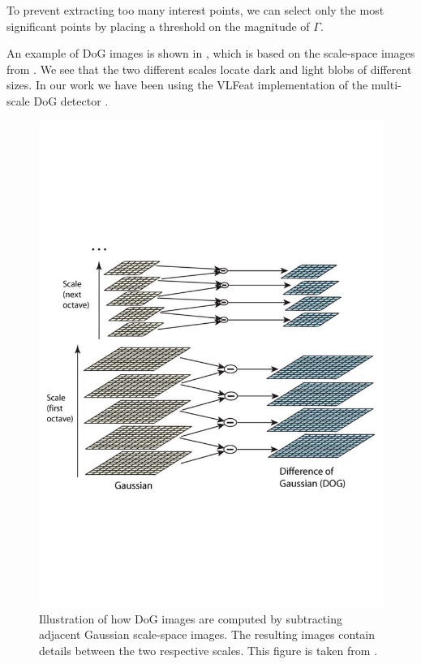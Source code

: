 \documentclass[thesis.tex]{subfiles}
\begin{document}
To prevent extracting too many interest points, we can select only the most significant points by placing a threshold on the magnitude of $\Gamma$.

An example of DoG images is shown in , which is based on the scale-space images from . We see that the two different scales locate dark and light blobs of different sizes. In our work we have been using the VLFeat implementation of the multi-scale DoG detector \citet{vedaldi2008vlfeat}.
%
\begin{figure}[p]
	\centering
	\includegraphics[width=\textwidth,clip=true,trim=0 200 0 220]{img/SIFT_dogspaces.pdf}
	\caption{Illustration of how DoG images are computed by subtracting adjacent Gaussian scale-space images. The resulting images contain details between the two respective scales. This figure is taken from \citet[figure 1,pp. 95]{lowe2004distinctive}.}
	\label{fig:dogSpaces}
	\vspace{5mm}


\end{figure}
\end{document}

